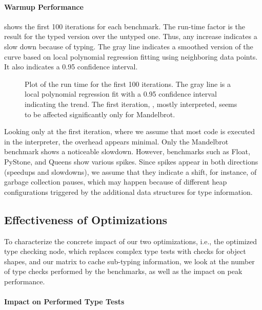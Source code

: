 \paragraph*{Warmup Performance}

 shows the first 100 iterations for each benchmark.
The run-time factor is the result for the typed version over the untyped one.
Thus, any increase indicates a slow down because of typing.
The gray line indicates a smoothed version of the curve
based on local polynomial regression fitting\citep{Cleveland:1992}
using neighboring data points.
It also indicates a 0.95 confidence interval.

\begin{figure}[htb]
  \centering
	\TypingWarmup{}
	\caption{Plot of the run time for the first 100 iterations.
           The gray line is a local polynomial regression fit
           with a 0.95 confidence interval
           indicating the trend.
           The first iteration, \ie, mostly interpreted, seems
           to be affected significantly only for Mandelbrot.}
	\label{fig:typing-warmup}
\end{figure}

Looking only at the first iteration,
where we assume that most code is executed in the interpreter,
the overhead appears minimal.
Only the Mandelbrot benchmark shows a noticeable slowdown.
However, benchmarks such as Float, PyStone, and Queens show various spikes.
Since spikes appear in both directions (speedups and slowdowns),
we assume that they indicate a shift,
for instance, of garbage collection pauses,
which may happen because of different heap configurations
triggered by the additional data structures for type information.

\subsection{Effectiveness of Optimizations}

To characterize the concrete impact of our two optimizations, i.e.,
the optimized type checking node, which replaces complex type tests
with checks for object shapes, and our matrix to cache sub-typing information,
we look at the number of type checks performed by the benchmarks,
as well as the impact on peak performance.

\paragraph*{Impact on Performed Type Tests}


